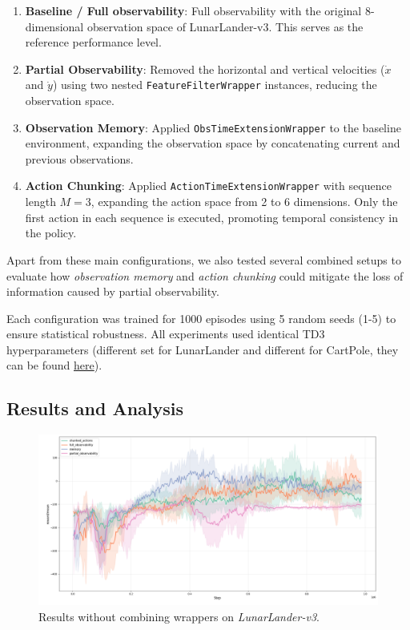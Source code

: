 \documentclass[12pt, a4paper]{article}
\begin{document}
\begin{enumerate}
	\item \textbf{Baseline / Full observability}: Full observability with the original 8-dimensional observation space of LunarLander-v3. This serves as the reference performance level.

	\item \textbf{Partial Observability}: Removed the horizontal and vertical velocities ($\dot{x}$ and $\dot{y}$) using two nested \texttt{FeatureFilterWrapper} instances, reducing the observation space.

	\item \textbf{Observation Memory}: Applied \texttt{ObsTimeExtensionWrapper} to the baseline environment, expanding the observation space by concatenating current and previous observations.

	\item \textbf{Action Chunking}: Applied \texttt{ActionTimeExtensionWrapper} with sequence length $M=3$, expanding the action space from 2 to 6 dimensions. Only the first action in each sequence is executed, promoting temporal consistency in the policy.
	
\end{enumerate}


Apart from these main configurations, we also tested several combined setups to evaluate how \textit{observation memory} and \textit{action chunking} could mitigate the loss of information caused by partial observability.

Each configuration was trained for 1000 episodes using 5 random seeds (1-5) to ensure statistical robustness. All experiments used identical TD3 hyperparameters (different set for LunarLander and different for CartPole, they can be found \href{https://github.com/KrystianPielat/rl-project-2/blob/master/run_experiments.py}{here}).

\subsection{Results and Analysis}

\begin{figure}[H]
	\centering
	\includegraphics[width=1\linewidth]{results_lunar_lander_basic}
	\caption{Results without combining wrappers on \textit{LunarLander-v3}.}
	\label{fig:resultslunarlanderbasic}
\end{figure}
\end{document}
